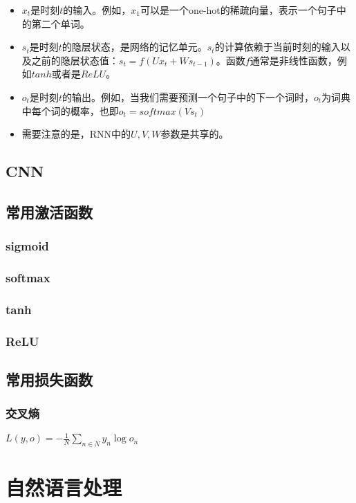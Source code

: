 \documentclass[UTF8,10pt,a4paper]{ctexbook}
\begin{document}
\begin{itemize}
\item $x_t$是时刻$t$的输入。例如，$x_1$可以是一个one-hot的稀疏向量，表示一个句子中的第二个单词。
\item $s_t$是时刻$t$的隐层状态，是网络的记忆单元。$s_t$的计算依赖于当前时刻的输入以及之前的隐层状态值：$s_t=f(Ux_t+Ws_{t-1})$。函数$f$通常是非线性函数，例如$tanh$或者是$ReLU$。
\item $o_t$是时刻$t$的输出。例如，当我们需要预测一个句子中的下一个词时，$o_t$为词典中每个词的概率，也即$o_t=softmax(Vs_t)$
\item 需要注意的是，RNN中的$U,V,W$参数是共享的。
\end{itemize}



\section{CNN}

\section{常用激活函数}

\subsection{sigmoid}
\subsection{softmax}
\subsection{tanh}
\subsection{ReLU}

\section{常用损失函数}
\subsection{交叉熵}

$L(y,o)=-\frac{1}{N}\sum\limits_{n \in N}{y_{n}\log{o_{n}}}$


\chapter{自然语言处理}
\end{document}
